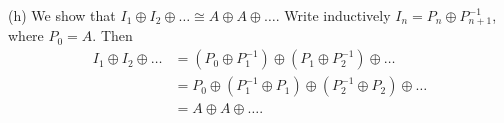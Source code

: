 \documentclass[11pt]{amsart}
\begin{document}
(h) We show that $I_1\oplus I_2\oplus \dots \cong A\oplus A \oplus \dots$. Write inductively $I_n = P_n\oplus P_{n+1}^{-1}$, where $P_0 = A$. Then 
\begin{align*}
    I_1\oplus I_2\oplus \dots &= (P_0 \oplus P_1^{-1})\oplus (P_1\oplus P_2^{-1}) \oplus \dots \\
    &= P_0 \oplus (P_1^{-1}\oplus P_1) \oplus (P_2^{-1}\oplus P_2) \oplus \dots \\
    &= A\oplus A \oplus \dots.
\end{align*}
\end{document}

